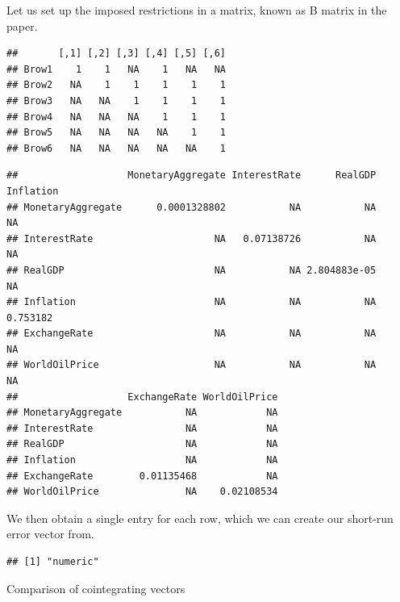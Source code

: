 \documentclass[11pt,preprint, authoryear]{elsarticle}
\numberwithin{equation}{section}
\numberwithin{figure}{section}
\numberwithin{table}{section}
\begin{document}
Let us set up the imposed restrictions in a matrix, known as B matrix in
the paper.

\begin{verbatim}
##       [,1] [,2] [,3] [,4] [,5] [,6]
## Brow1    1    1   NA    1   NA   NA
## Brow2   NA    1    1    1    1    1
## Brow3   NA   NA    1    1    1    1
## Brow4   NA   NA   NA    1    1    1
## Brow5   NA   NA   NA   NA    1    1
## Brow6   NA   NA   NA   NA   NA    1
\end{verbatim}

\begin{verbatim}
##                   MonetaryAggregate InterestRate      RealGDP Inflation
## MonetaryAggregate      0.0001328802           NA           NA        NA
## InterestRate                     NA   0.07138726           NA        NA
## RealGDP                          NA           NA 2.804883e-05        NA
## Inflation                        NA           NA           NA  0.753182
## ExchangeRate                     NA           NA           NA        NA
## WorldOilPrice                    NA           NA           NA        NA
##                   ExchangeRate WorldOilPrice
## MonetaryAggregate           NA            NA
## InterestRate                NA            NA
## RealGDP                     NA            NA
## Inflation                   NA            NA
## ExchangeRate        0.01135468            NA
## WorldOilPrice               NA    0.02108534
\end{verbatim}

We then obtain a single entry for each row, which we can create our
short-run error vector from.

\begin{verbatim}
## [1] "numeric"
\end{verbatim}

Comparison of cointegrating vectors
\end{document}
